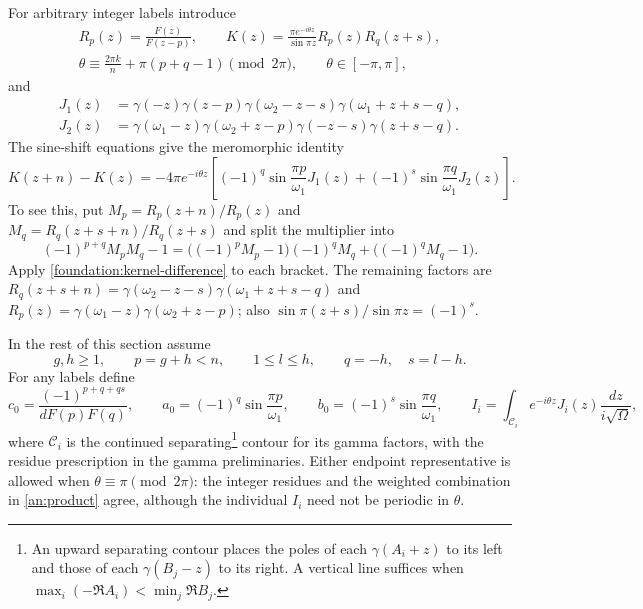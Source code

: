 For arbitrary integer labels introduce
\begin{gather*}
 R_p(z)=\frac{F(z)}{F(z-p)},\qquad
 K(z)=\frac{\pi e^{-i\theta z}}{\sin\pi z}R_p(z)R_q(z+s),\\
 \theta\equiv\frac{2\pi k}{n}+\pi(p+q-1)\pmod{2\pi},\qquad
 \theta\in[-\pi,\pi],
\end{gather*}
and
\begin{align*}
 J_1(z)&=\gamma(-z)\gamma(z-p)
                   \gamma(\omega_2-z-s)\gamma(\omega_1+z+s-q),\\
 J_2(z)&=\gamma(\omega_1-z)\gamma(\omega_2+z-p)
                   \gamma(-z-s)\gamma(z+s-q).
\end{align*}
The sine-shift equations give the meromorphic identity
\begin{equation}
 K(z+n)-K(z)=-4\pi e^{-i\theta z}
 \left[(-1)^q\sin\frac{\pi p}{\omega_1}J_1(z)
       +(-1)^s\sin\frac{\pi q}{\omega_1}J_2(z)\right].
 \label{an:two-ratio}
\end{equation}
To see this, put $M_p=R_p(z+n)/R_p(z)$ and
$M_q=R_q(z+s+n)/R_q(z+s)$ and split the multiplier into
\[
 (-1)^{p+q}M_pM_q-1
 =\bigl((-1)^pM_p-1\bigr)(-1)^qM_q+
                                      \bigl((-1)^qM_q-1\bigr).
\]
Apply \eqref{foundation:kernel-difference}
to each bracket.  The remaining factors are
$R_q(z+s+n)=\gamma(\omega_2-z-s)\gamma(\omega_1+z+s-q)$ and
$R_p(z)=\gamma(\omega_1-z)\gamma(\omega_2+z-p)$; also
$\sin\pi(z+s)/\sin\pi z=(-1)^s$.

In the rest of this section assume
\begin{equation}
 g,h\ge1,\qquad p=g+h<n,\qquad 1\le l\le h,
 \qquad q=-h,\quad s=l-h.
 \label{an:ordered}
\end{equation}
For any labels define
\[
 c_0=\frac{(-1)^{p+q+qs}}{dF(p)F(q)},\qquad
 a_0=(-1)^q\sin\frac{\pi p}{\omega_1},\qquad
 b_0=(-1)^s\sin\frac{\pi q}{\omega_1},\qquad
 I_i=\int_{\mathcal C_i}e^{-i\theta z}J_i(z)
                                    \frac{dz}{i\sqrt\Omega},
\]
where $\mathcal C_i$ is the continued separating\footnote{An upward separating contour places the poles of each $\gamma(A_i+z)$ to its left and those of each $\gamma(B_j-z)$ to its right. A vertical line suffices when $\max_i(-\Re A_i)<\min_j\Re B_j$.}
contour for its gamma factors, with the residue prescription in the
gamma preliminaries.  Either endpoint representative is allowed when
$\theta\equiv\pi\pmod{2\pi}$: the integer residues and the weighted
combination in \eqref{an:product} agree, although the individual $I_i$
need not be periodic in $\theta$.

